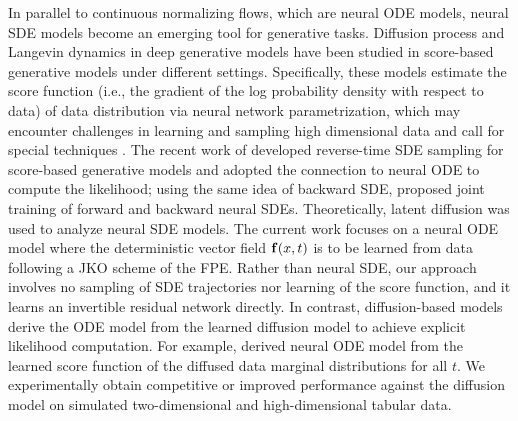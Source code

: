 \documentclass{article}
\theoremstyle{remark}
\theoremstyle{plain}
\begin{document}
%
In parallel to continuous normalizing flows, which are neural ODE models, neural SDE models become an emerging tool for generative tasks. Diffusion process and Langevin dynamics in deep generative models have been studied in score-based generative models \citep{song2019generative,ho2020denoising,block2020generative,song2021score} under different settings. 
Specifically, these models estimate the score function
(i.e., the gradient of the log probability density with respect to data) of data distribution via neural network parametrization, which may encounter challenges in learning and sampling high dimensional data and call for special techniques \citep{song2019generative}.
The recent work of \cite{song2021score}  developed reverse-time SDE  sampling for score-based generative models 
and adopted the connection to neural ODE to compute the likelihood; using the same idea of backward SDE, \cite{zhang2021diffusion} proposed joint training of forward and backward neural SDEs. Theoretically, latent diffusion \cite{tzen2019theoretical,tzen2019neural}  was used to analyze neural SDE models.
%
The current work focuses on a neural ODE model where the deterministic vector field ${\bf f}(x,t)$ is to be learned from data following a JKO scheme of the FPE.
%
Rather than neural SDE, our approach involves no sampling of SDE trajectories nor learning of the score function, and it learns an invertible residual network directly. 
In contrast, diffusion-based models derive the ODE model from the learned diffusion model to achieve explicit likelihood computation.
For example,  \cite{song2021score} derived neural ODE model
from the learned score function of the diffused data marginal distributions for all $t$.
%
We experimentally obtain competitive or improved performance against the diffusion model on simulated two-dimensional and high-dimensional tabular data.
\end{document}
